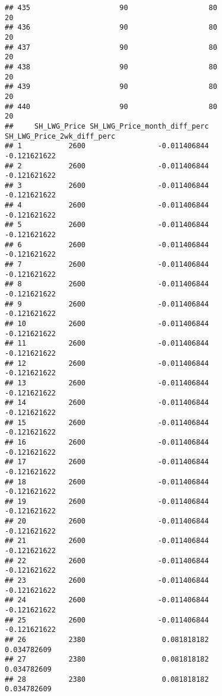 \documentclass[]{article}
\begin{document}
\begin{verbatim}
## 435                     90                   80                   20
## 436                     90                   80                   20
## 437                     90                   80                   20
## 438                     90                   80                   20
## 439                     90                   80                   20
## 440                     90                   80                   20
##     SH_LWG_Price SH_LWG_Price_month_diff_perc SH_LWG_Price_2wk_diff_perc
## 1           2600                 -0.011406844               -0.121621622
## 2           2600                 -0.011406844               -0.121621622
## 3           2600                 -0.011406844               -0.121621622
## 4           2600                 -0.011406844               -0.121621622
## 5           2600                 -0.011406844               -0.121621622
## 6           2600                 -0.011406844               -0.121621622
## 7           2600                 -0.011406844               -0.121621622
## 8           2600                 -0.011406844               -0.121621622
## 9           2600                 -0.011406844               -0.121621622
## 10          2600                 -0.011406844               -0.121621622
## 11          2600                 -0.011406844               -0.121621622
## 12          2600                 -0.011406844               -0.121621622
## 13          2600                 -0.011406844               -0.121621622
## 14          2600                 -0.011406844               -0.121621622
## 15          2600                 -0.011406844               -0.121621622
## 16          2600                 -0.011406844               -0.121621622
## 17          2600                 -0.011406844               -0.121621622
## 18          2600                 -0.011406844               -0.121621622
## 19          2600                 -0.011406844               -0.121621622
## 20          2600                 -0.011406844               -0.121621622
## 21          2600                 -0.011406844               -0.121621622
## 22          2600                 -0.011406844               -0.121621622
## 23          2600                 -0.011406844               -0.121621622
## 24          2600                 -0.011406844               -0.121621622
## 25          2600                 -0.011406844               -0.121621622
## 26          2380                  0.081818182                0.034782609
## 27          2380                  0.081818182                0.034782609
## 28          2380                  0.081818182                0.034782609

\end{verbatim}
\end{document}
